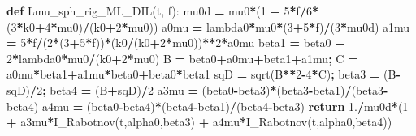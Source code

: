\documentclass[
  a4paper,
  numbers=noendperiod,
  DIV=12]{scrreprt}
\newenvironment{Shaded}{\begin{snugshade}}{\end{snugshade}}
\newcommand{\ControlFlowTok}[1]{\textcolor[rgb]{0.13,0.29,0.53}{\textbf{#1}}}
\newcommand{\DecValTok}[1]{\textcolor[rgb]{0.00,0.00,0.81}{#1}}
\newcommand{\FloatTok}[1]{\textcolor[rgb]{0.00,0.00,0.81}{#1}}
\newcommand{\KeywordTok}[1]{\textcolor[rgb]{0.13,0.29,0.53}{\textbf{#1}}}
\newcommand{\NormalTok}[1]{#1}
\newcommand{\OperatorTok}[1]{\textcolor[rgb]{0.81,0.36,0.00}{\textbf{#1}}}
\begin{document}
\begin{Shaded}
\begin{Highlighting}[]
\KeywordTok{def}\NormalTok{ Lmu\_sph\_rig\_ML\_DIL(t, f):}
\NormalTok{    mu0d  }\OperatorTok{=}\NormalTok{ mu0}\OperatorTok{*}\NormalTok{(}\DecValTok{1} \OperatorTok{+} \DecValTok{5}\OperatorTok{*}\NormalTok{f}\OperatorTok{/}\DecValTok{6}\OperatorTok{*}\NormalTok{(}\DecValTok{3}\OperatorTok{*}\NormalTok{k0}\OperatorTok{+}\DecValTok{4}\OperatorTok{*}\NormalTok{mu0)}\OperatorTok{/}\NormalTok{(k0}\OperatorTok{+}\DecValTok{2}\OperatorTok{*}\NormalTok{mu0))}
\NormalTok{    a0mu  }\OperatorTok{=}\NormalTok{ lambda0}\OperatorTok{*}\NormalTok{mu0}\OperatorTok{*}\NormalTok{(}\DecValTok{3}\OperatorTok{+}\DecValTok{5}\OperatorTok{*}\NormalTok{f)}\OperatorTok{/}\NormalTok{(}\DecValTok{3}\OperatorTok{*}\NormalTok{mu0d)}
\NormalTok{    a1mu  }\OperatorTok{=} \DecValTok{5}\OperatorTok{*}\NormalTok{f}\OperatorTok{/}\NormalTok{(}\DecValTok{2}\OperatorTok{*}\NormalTok{(}\DecValTok{3}\OperatorTok{+}\DecValTok{5}\OperatorTok{*}\NormalTok{f))}\OperatorTok{*}\NormalTok{(k0}\OperatorTok{/}\NormalTok{(k0}\OperatorTok{+}\DecValTok{2}\OperatorTok{*}\NormalTok{mu0))}\OperatorTok{**}\DecValTok{2}\OperatorTok{*}\NormalTok{a0mu}
\NormalTok{    beta1 }\OperatorTok{=}\NormalTok{ beta0 }\OperatorTok{+} \DecValTok{2}\OperatorTok{*}\NormalTok{lambda0}\OperatorTok{*}\NormalTok{mu0}\OperatorTok{/}\NormalTok{(k0}\OperatorTok{+}\DecValTok{2}\OperatorTok{*}\NormalTok{mu0)}
\NormalTok{    B }\OperatorTok{=}\NormalTok{ beta0}\OperatorTok{+}\NormalTok{a0mu}\OperatorTok{+}\NormalTok{beta1}\OperatorTok{+}\NormalTok{a1mu}\OperatorTok{;}\NormalTok{  C }\OperatorTok{=}\NormalTok{ a0mu}\OperatorTok{*}\NormalTok{beta1}\OperatorTok{+}\NormalTok{a1mu}\OperatorTok{*}\NormalTok{beta0}\OperatorTok{+}\NormalTok{beta0}\OperatorTok{*}\NormalTok{beta1}
\NormalTok{    sqD }\OperatorTok{=}\NormalTok{ sqrt(B}\OperatorTok{**}\DecValTok{2}\OperatorTok{{-}}\DecValTok{4}\OperatorTok{*}\NormalTok{C)}\OperatorTok{;}\NormalTok{  beta3 }\OperatorTok{=}\NormalTok{ (B}\OperatorTok{{-}}\NormalTok{sqD)}\OperatorTok{/}\DecValTok{2}\OperatorTok{;}\NormalTok{  beta4 }\OperatorTok{=}\NormalTok{ (B}\OperatorTok{+}\NormalTok{sqD)}\OperatorTok{/}\DecValTok{2}
\NormalTok{    a3mu }\OperatorTok{=}\NormalTok{ (beta0}\OperatorTok{{-}}\NormalTok{beta3)}\OperatorTok{*}\NormalTok{(beta3}\OperatorTok{{-}}\NormalTok{beta1)}\OperatorTok{/}\NormalTok{(beta3}\OperatorTok{{-}}\NormalTok{beta4)}
\NormalTok{    a4mu }\OperatorTok{=}\NormalTok{ (beta0}\OperatorTok{{-}}\NormalTok{beta4)}\OperatorTok{*}\NormalTok{(beta4}\OperatorTok{{-}}\NormalTok{beta1)}\OperatorTok{/}\NormalTok{(beta4}\OperatorTok{{-}}\NormalTok{beta3)}
    \ControlFlowTok{return} \FloatTok{1.}\OperatorTok{/}\NormalTok{mu0d}\OperatorTok{*}\NormalTok{(}\DecValTok{1} \OperatorTok{+}\NormalTok{ a3mu}\OperatorTok{*}\NormalTok{I\_Rabotnov(t,alpha0,beta3) }\OperatorTok{+}\NormalTok{ a4mu}\OperatorTok{*}\NormalTok{I\_Rabotnov(t,alpha0,beta4))}


\end{Highlighting}
\end{Shaded}
\end{document}
